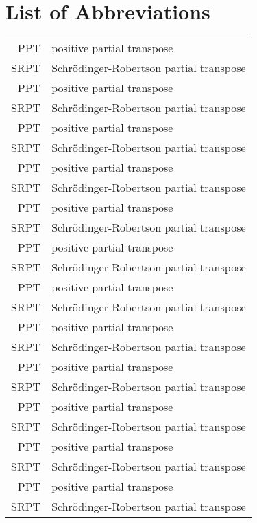 \chapter*{List of Abbreviations}

\begin{longtable}{rl}
    PPT  & positive partial transpose                \\
    SRPT & Schr\"odinger-Robertson partial transpose \\
    PPT  & positive partial transpose                \\
    SRPT & Schr\"odinger-Robertson partial transpose \\
    PPT  & positive partial transpose                \\
    SRPT & Schr\"odinger-Robertson partial transpose \\
    PPT  & positive partial transpose                \\
    SRPT & Schr\"odinger-Robertson partial transpose \\
    PPT  & positive partial transpose                \\
    SRPT & Schr\"odinger-Robertson partial transpose \\
    PPT  & positive partial transpose                \\
    SRPT & Schr\"odinger-Robertson partial transpose \\
    PPT  & positive partial transpose                \\
    SRPT & Schr\"odinger-Robertson partial transpose \\
    PPT  & positive partial transpose                \\
    SRPT & Schr\"odinger-Robertson partial transpose \\
    PPT  & positive partial transpose                \\
    SRPT & Schr\"odinger-Robertson partial transpose \\
    PPT  & positive partial transpose                \\
    SRPT & Schr\"odinger-Robertson partial transpose \\
    PPT  & positive partial transpose                \\
    SRPT & Schr\"odinger-Robertson partial transpose \\
    PPT  & positive partial transpose                \\
    SRPT & Schr\"odinger-Robertson partial transpose \\

\end{longtable}
